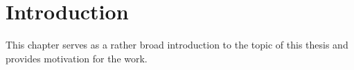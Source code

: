 
\chapter{Introduction}  %

\ifpdf
    \graphicspath{{Chapter1/Figs/Raster/}{Chapter1/Figs/PDF/}{Chapter1/Figs/}}
\else
    \graphicspath{{Chapter1/Figs/Vector/}{Chapter1/Figs/}}
\fi

This chapter serves as a rather broad introduction to the topic of this thesis and provides motivation for the work.

